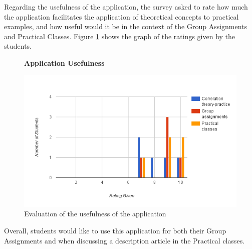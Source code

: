 \documentclass[conference]{IEEEtran}
\begin{document}
Regarding the usefulness of the application, the survey asked to rate how much the application facilitates the application of theoretical concepts to practical examples, and how useful would it be in the context of the Group Assignments and Practical Classes. Figure \ref{figure:usefulnessEvaluation} shows the graph of the ratings given by the students.

\begin{figure}[h]
\centering
\begin{normalsize}
\textbf{Application Usefulness}\\
\end{normalsize}
\includegraphics[scale=0.4]{images/graph3}
\caption{Evaluation of the usefulness of the application}
\label{figure:usefulnessEvaluation}
\end{figure}

Overall, students would like to use this application for both their Group Assignments and when discussing a description article in the Practical classes. 
\end{document}
